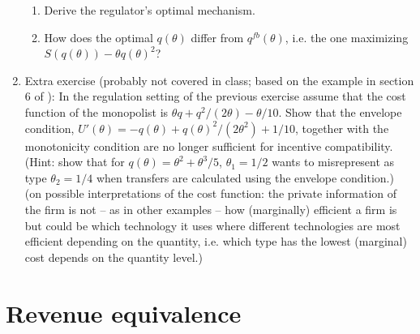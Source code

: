 \documentclass[a4paper,12pt]{article}
\begin{document}
\begin{enumerate}
\begin{enumerate}
  \item Derive the regulator's optimal mechanism.
    \item How does the optimal $q(\theta )$ differ from $q^{fb}(\theta )$, i.e. the one maximizing $S(q(\theta ))-\theta q(\theta )^2$? 
    \end{enumerate}
  \item Extra exercise (probably not covered in class; based on the example in section 6 of \cite{schottmueller2015jet}): In the regulation setting of the previous exercise assume that the cost function of the monopolist is $\theta q+q^2/(2\theta)-\theta /10$. Show that the envelope condition, $U'(\theta )=-q(\theta )+q(\theta )^2/(2\theta ^2)+1/10$, together with the monotonicity condition are no longer sufficient for incentive compatibility. (Hint: show that for $q(\theta )=\theta ^2+\theta ^3/5$, $\theta _1=1/2$ wants to misrepresent as type $\theta _2=1/4$ when transfers are calculated using the envelope condition.)\\
    (on possible interpretations of the cost function: the private information of the firm is not -- as in other examples -- how (marginally) efficient a firm is but could be which technology it uses where different technologies are most efficient depending on the quantity, i.e. which type has the lowest (marginal) cost depends on the quantity level.)
\end{enumerate}

\section{Revenue equivalence}
\label{sec:revenue-equivalence}
\end{document}
